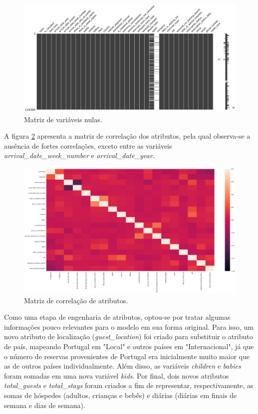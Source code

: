 \documentclass{homework}
\begin{document}
\begin{figure}[h!]
    \centerline{\includegraphics[scale=0.3]{null_matrix.png}}
    \caption{Matriz de variáveis nulas.}
    \label{null_matrix}
\end{figure}

A figura \ref{heatmap} apresenta a matriz de correlação dos atributos, pela qual observa-se a
ausência de fortes correlações, exceto entre as variáveis \textit{arrival\_date\_week\_number} e
\textit{arrival\_date\_year}.

\begin{figure}[h!]
    \centerline{\includegraphics[scale=0.25]{heatmap.png}}
    \caption{Matriz de correlação de atributos.}
    \label{heatmap}
\end{figure}

Como uma etapa de engenharia de atributos, optou-se por tratar algumas informações pouco relevantes para o modelo em sua
forma original. Para isso, um novo atributo de localização (\textit{guest\_location}) foi criado para substituir o
atributo de país, mapeando Portugal em "Local" e outros países em "Internacional", já que o número de reservas
provenientes de Portugal era inicialmente muito maior que as de outros países individualmente. Além disso, as variáveis
\textit{children} e \textit{babies} foram somadas em uma nova variável \textit{kids}. Por final, dois novos atributos
\textit{total\_guests} e \textit{total\_stays} foram criados a fim de representar, respectivamente, as somas de hóspedes
(adultos, crianças e bebês) e diárias (diárias em finais de semana e dias de semana).
\end{document}
